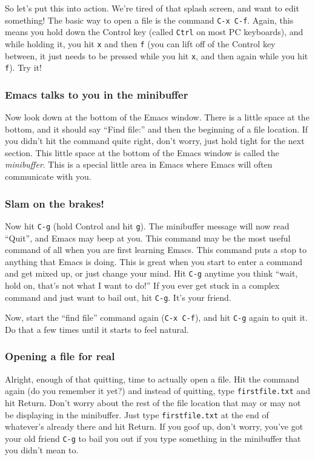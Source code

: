 \documentclass{article}
\begin{document}
So let's put this into action.  We're tired of that splash screen, and want to edit something!  The basic way to open a file is the command \texttt{C-x C-f}.  Again, this means you hold down the Control key (called \texttt{Ctrl} on most PC keyboards), and while holding it, you hit \texttt{x} and then \texttt{f} (you can lift off of the Control key between, it just needs to be pressed while you hit \texttt{x}, and then again while you hit \texttt{f}). Try it!
\subsubsection{Emacs talks to you in the minibuffer}
\label{sec-4-2-3}

Now look down at the bottom of the Emacs window.  There is a little space at the bottom, and it should say ``Find file:'' and then the beginning of a file location. If you didn't hit the command quite right, don't worry, just hold tight for the next section. This little space at the bottom of the Emacs window is called the \emph{minibuffer}. This is a special little area in Emacs where Emacs will often communicate with you.
\subsubsection{Slam on the brakes!}
\label{sec-4-2-4}

Now hit \texttt{C-g} (hold Control and hit \texttt{g}).  The minibuffer message will now read ``Quit'', and Emacs may beep at you. This command may be the most useful command of all when you are first learning Emacs.  This command puts a stop to anything that Emacs is doing. This is great when you start to enter a command and get mixed up, or just change your mind.  Hit \texttt{C-g} anytime you think ``wait, hold on, that's not what I want to do!''  If you ever get stuck in a complex command and just want to bail out, hit \texttt{C-g}. It's your friend.

Now, start the ``find file'' command again (\texttt{C-x C-f}), and hit \texttt{C-g} again to quit it.  Do that a few times until it starts to feel natural.
\subsubsection{Opening a file for real}
\label{sec-4-2-5}

Alright, enough of that quitting, time to actually open a file.  Hit the command again (do you remember it yet?) and instead of quitting, type \texttt{firstfile.txt} and hit Return.  Don't worry about the rest of the file location that may or may not be displaying in the minibuffer.  Just type \texttt{firstfile.txt} at the end of whatever's already there and hit Return.  If you goof up, don't worry, you've got your old friend \texttt{C-g} to bail you out if you type something in the minibuffer that you didn't mean to.
\end{document}
